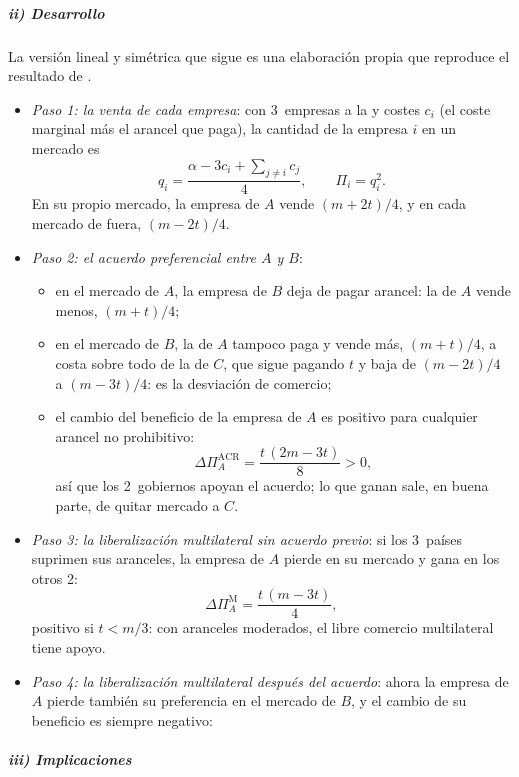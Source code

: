 \documentclass[11pt]{article}
\begin{document}
\subparagraph{ii) Desarrollo}

La versión lineal y simétrica que sigue es una elaboración propia que reproduce el resultado de \textcite{Krishna1998}.

\begin{itemize}
\item \emph{Paso 1: la venta de cada empresa}: con 3~empresas a la  y costes $c_i$ (el coste marginal más el arancel que paga), la cantidad de la empresa $i$ en un mercado es
  $$q_i=\frac{\alpha-3c_i+\sum_{j\neq i}c_j}{4},\qquad \Pi_i=q_i^2 .$$
  En su propio mercado, la empresa de $A$ vende $(m+2t)/4$, y en cada mercado de fuera, $(m-2t)/4$.
\item \emph{Paso 2: el acuerdo preferencial entre $A$ y $B$}:
  \begin{itemize}
  \item en el mercado de $A$, la empresa de $B$ deja de pagar arancel: la de $A$ vende menos, $(m+t)/4$;
  \item en el mercado de $B$, la de $A$ tampoco paga y vende más, $(m+t)/4$, a costa sobre todo de la de $C$, que sigue pagando $t$ y baja de $(m-2t)/4$ a $(m-3t)/4$: es la desviación de comercio;
  \item el cambio del beneficio de la empresa de $A$ es positivo para cualquier arancel no prohibitivo:
    $$\Delta\Pi_A^{\text{ACR}}=\frac{t\,(2m-3t)}{8}>0,$$
    así que los 2~gobiernos apoyan el acuerdo; lo que ganan sale, en buena parte, de quitar mercado a $C$.
  \end{itemize}
\item \emph{Paso 3: la liberalización multilateral sin acuerdo previo}: si los 3~países suprimen sus aranceles, la empresa de $A$ pierde en su mercado y gana en los otros 2:
  $$\Delta\Pi_A^{\text{M}}=\frac{t\,(m-3t)}{4},$$
  positivo si $t<m/3$: con aranceles moderados, el libre comercio multilateral tiene apoyo.
\item \emph{Paso 4: la liberalización multilateral después del acuerdo}: ahora la empresa de $A$ pierde también su preferencia en el mercado de $B$, y el cambio de su beneficio es siempre negativo:
\end{itemize}

\subparagraph{iii) Implicaciones}
\end{document}
